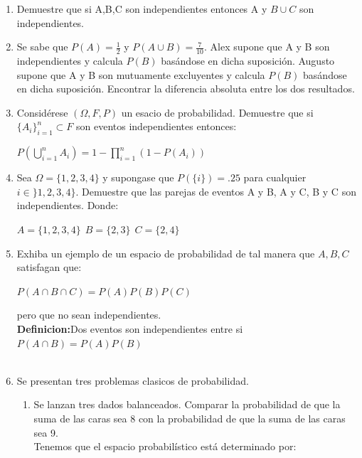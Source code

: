 \documentclass[12pt,a4paper]{report}
\begin{document}
\begin{enumerate}
   \item {
   Demuestre que si A,B,C son independientes entonces A y $B\cup C$ son independientes.
	
    }

   \item {
   Se sabe que $P(A)= \frac{1}{2}$ y $P(A\cup B)=\frac{7}{10}$. Alex supone que A y B son independientes y calcula $P(B)$ basándose en dicha suposición. Augusto supone que A y B son mutuamente excluyentes y calcula $P(B)$ basándose en dicha suposición. Encontrar la diferencia absoluta entre los dos resultados.
	}

   \item {
   Considérese $(\Omega,F, P)$ un esacio de probabilidad. Demuestre que si $\lbrace A_{i} \rbrace _{i=1}^{n} \subset F$ son eventos independientes entonces:\\
   \begin{center}
   $P(\bigcup\limits_{i=1}^{n} A_{i})=1-\prod\limits_{i=1}^{n} (1-P(A_{i}))$
   \end{center}
	}

   \item {
    Sea $\Omega = \lbrace 1,2,3,4 \rbrace$ y supongase que $P(\lbrace i \rbrace)=.25$ para cualquier $i\in \rbrace 1,2,3,4 \rbrace$. Demuestre que las parejas de eventos A y B, A y C, B y C son independientes. Donde:\\
    \begin{center}
    $A=\lbrace 1,2,3,4 \rbrace \ \ B=\lbrace 2,3 \rbrace \ \ C= \lbrace 2,4 \rbrace $
\end{center}     
	}

   \item {
  Exhiba un ejemplo de un espacio de probabilidad de tal manera que $A,B,C$ satisfagan que: \\ 
  \begin{center}
  $P(A\cap B \cap C) = P(A)P(B)P(C)$
  \end{center}
  pero que no sean independientes.\\
  \textbf{Definicion:}Dos eventos son independientes entre si $P(A\cap B)=P(A)P(B)$\\ \\ 
  }

   \item {
    Se presentan tres problemas clasicos de probabilidad. 
    
    \begin{enumerate}[label=\alph*) ]
    \item{Se lanzan tres dados balanceados. Comparar la probabilidad de que la suma de las caras sea 8 con la probabilidad de que la suma de las caras sea 9.
    \\
    Tenemos que el espacio probabilístico está determinado por:\\
    
}
\end{enumerate}}
\end{enumerate}
\end{document}
